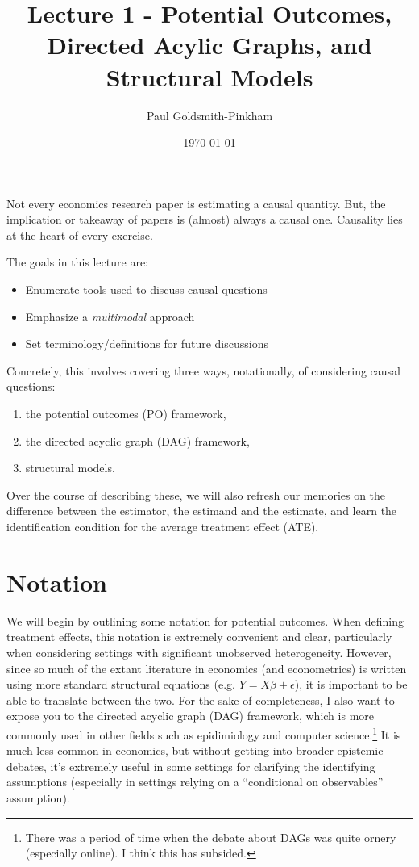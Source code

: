 \documentclass{tufte-handout}
\title{Lecture 1 - Potential Outcomes, Directed Acylic Graphs, and Structural Models}
\author{Paul Goldsmith-Pinkham}
\date{\today}
\theoremstyle{break}
\begin{document}
\maketitle



Not every economics research paper is estimating a causal quantity. But, the implication or takeaway of papers is (almost) always a causal one.  Causality lies at the heart of every exercise. 

The goals in this lecture are:
\begin{itemize}
  \item Enumerate tools used to discuss causal questions
  \item Emphasize a \emph{multimodal} approach
  \item Set terminology/definitions for future discussions
\end{itemize}

Concretely, this involves covering three ways, notationally, of considering 
causal questions:
\begin{enumerate}
  \item the potential outcomes (PO) framework,
  \item the directed acyclic graph (DAG) framework,
  \item structural models. 
\end{enumerate}

Over the course of describing these, we will also refresh our memories on the difference between the estimator, the estimand and the estimate, and learn the identification condition for the average treatment effect (ATE).

\section{Notation}
We will begin by outlining some notation for potential outcomes. 
When defining treatment effects, this notation is extremely convenient and 
clear, particularly when considering settings with significant unobserved heterogeneity.
However, since so much of the extant literature in economics (and econometrics) is
written using more standard structural equations (e.g. $Y = X\beta + \epsilon$),
it is important to be able to translate between the two. For the sake of completeness,
I also want to expose you to the directed acyclic graph (DAG) framework, \citep{pearl2009causality, imbens2020potential} 
which is more commonly used in other fields such as epidimiology and computer science.\footnote{There was a period of time when the debate about DAGs was quite ornery (especially online). I think this has subsided.} It is 
much less common in economics, but without getting into broader epistemic debates, it's 
extremely useful in some settings for clarifying the identifying assumptions (especially in
settings relying on a ``conditional on observables'' assumption).
\end{document}
